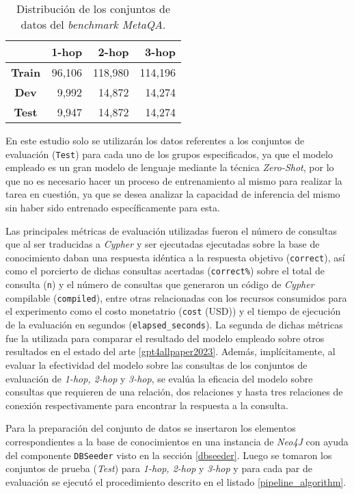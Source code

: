 \begin{table}[h]
\centering
\begin{tabular}{|c|r|r|r|}
\hline
 & \textbf{1-hop} & \textbf{2-hop} & \textbf{3-hop} \\ \hline
\textbf{Train} & 96,106 & 118,980 & 114,196 \\ \hline
\textbf{Dev} & 9,992 & 14,872 & 14,274 \\ \hline
\textbf{Test} & 9,947 & 14,872 & 14,274 \\ \hline
\end{tabular}
\caption{Distribución de los conjuntos de datos del \textit{benchmark MetaQA}.}
\label{tab:metaqatable}
\end{table}

En este estudio solo se utilizarán los datos referentes a los conjuntos de evaluación (\texttt{Test}) para cada uno de los grupos especificados, ya que el modelo empleado es un gran modelo de lenguaje mediante la técnica \textit{Zero-Shot}, por lo que no es necesario hacer un proceso de entrenamiento al mismo para realizar la tarea en cuestión, ya que se desea analizar la capacidad de inferencia del mismo sin haber sido entrenado específicamente para esta.

Las principales métricas de evaluación utilizadas fueron el número de consultas que al ser traducidas a \textit{Cypher} y ser ejecutadas ejecutadas sobre la base de conocimiento daban una respuesta idéntica a la respuesta objetivo (\texttt{correct}), así como el porcierto de dichas consultas acertadas (\texttt{correct\%}) sobre el total de consulta (\texttt{n}) y el número de consultas que generaron un código de \textit{Cypher} compilable (\texttt{compiled}), entre otras relacionadas con los recursos consumidos para el experimento como el costo monetatrio (\texttt{cost} (USD)) y el tiempo de ejecución de la evaluación en segundos (\texttt{elapsed\_seconds}). La segunda de dichas métricas fue la utilizada para comparar el resultado del modelo empleado sobre otros resultados en el estado del arte \ref{gpt4allpaper2023}. Además, implícitamente, al evaluar la efectividad del modelo sobre las consultas de los conjuntos de evaluación de \textit{1-hop, 2-hop} y \textit{3-hop}, se evalúa la eficacia del modelo sobre consultas que requieren de una relación, dos relaciones y hasta tres relaciones de conexión respectivamente para encontrar la respuesta a la consulta.

Para la preparación del conjunto de datos se insertaron los elementos correspondientes a la base de conocimientos en una instancia de \textit{Neo4J} con ayuda del componente \texttt{DBSeeder} visto en la sección \ref{dbseeder}. Luego se tomaron los conjuntos de prueba (\textit{Test}) para \textit{1-hop, 2-hop} y \textit{3-hop} y para cada par de evaluación se ejecutó el procedimiento descrito en el listado \ref{pipeline_algorithm}. 

